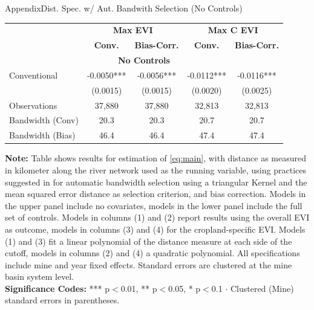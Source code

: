\documentclass[aspectratio=169,11pt,dvipsnames, handout]{beamer}
\begin{document}
\begin{frame}{\textcolor{defaultclr!30}{Appendix}\hspace{0.75em}Dist. Spec. w/ Aut. Bandwith Selection (No Controls)}

\label{frame:autband}

\centering
\begin{adjustbox}{width=0.8\textwidth}
\begin{tabular}{lcccc}
\toprule
& \multicolumn{2}{c}{\textbf{Max EVI}} & \multicolumn{2}{c}{\textbf{Max C EVI}} \\
\cmidrule(lr){2-3} \cmidrule(lr){4-5}
& \textbf{Conv.} & \textbf{Bias-Corr.} & \textbf{Conv.} & \textbf{Bias-Corr.} \\
\midrule
\multicolumn{5}{c}{\textbf{No Controls}} \\
\midrule
Conventional & -0.0050*** & -0.0056*** & -0.0112*** & -0.0116*** \\
& (0.0015) & (0.0015) & (0.0020) & (0.0025) \\
\midrule
Observations & 37,880 & 37,880 & 32,813 & 32,813 \\
Bandwidth (Conv) & 20.3 & 20.3 & 20.7 & 20.7 \\
Bandwidth (Bias) & 46.4 & 46.4 & 47.4 & 47.4 \\
\bottomrule
\end{tabular}
\end{adjustbox}

\vspace{3pt}

\scriptsize{
\textbf{Note:} Table shows results for estimation of \autoref{eq:main}, with distance as measured in kilometer along the river network used as the running variable, using practices suggested in \cite{cattaneo2019} for automatic bandwidth selection using a triangular Kernel and the mean squared error distance as selection criterion, and bias correction. Models in the upper panel include no covariates, models in the lower panel include the full set of controls. Models in columns (1) and (2) report results using the overall EVI as outcome, models in columns (3) and (4) for the cropland-specific EVI. Models (1) and (3) fit a linear polynomial of the distance measure at each side of the cutoff, models in columns (2) and (4) a quadratic polynomial. All specifications include mine and year fixed effects. Standard errors are clustered at the mine basin system level. \\
\textbf{Significance Codes:} *** p$<$0.01, ** p$<$0.05, * p$<$0.1 $\cdot$ Clustered (Mine) standard errors in parentheses.
}
\end{frame}
\end{document}
